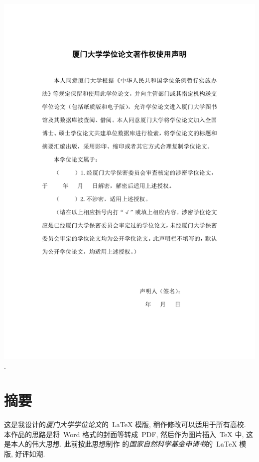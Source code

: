 \documentclass[12pt]{ctexbook}
\theoremstyle{definition}
\theoremstyle{remark}
\begin{document}
\vspace*{-10pt}
\hspace{-20pt}\includegraphics[clip,viewport=88 104 506 767,width=418pt]{use}\newpage.\newpage


\pagestyle{fancy}\fancyhf{}\fancyhead[LE,RO]{\thepage}



\chapter*{摘要}
\setcounter{page}{1}

这是我设计的\emph{厦门大学学位论文}的~\LaTeX{} 模版, 稍作修改可以适用于所有高校. 
本作品的思路是将~Word 格式的封面等转成~PDF, 然后作为图片插入~\TeX{} 中, 这是本人的伟大思想. 此前按此思想制作
的\emph{国家自然科学基金申请书}的~\LaTeX{} 模版, 好评如潮.
\end{document}
